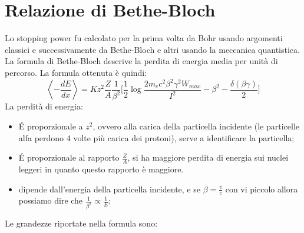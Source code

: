 \documentclass[12pt, letterpaper]{book}
\newcommand{\medio}[1]{\left\langle{#1}\right\rangle}
\begin{document}
\section{Relazione di Bethe-Bloch}
Lo stopping power fu calcolato per la prima volta da Bohr usando argomenti classici e successivamente da Bethe-Bloch e altri usando la meccanica quantistica.\\
La formula di Bethe-Bloch descrive la perdita di energia media per unità di percorso. La formula ottenuta è quindi:
\begin{equation*}
    \medio{-\frac{dE}{dx}}=Kz^2\frac{Z}{A}\frac{1}{\beta^2}\Bigg[ \frac{1}{2} \log{\frac{2m_ec^2\beta^2\gamma^2W_{max}}{I^2}}-\beta^2-\frac{\delta(\beta\gamma)}{2} \Bigg]
\end{equation*}
La perdità di energia:
\begin{itemize}
    \item \'E proporzionale a $z^2$, ovvero alla carica della particella incidente (le particelle alfa perdono 4 volte più carica dei protoni), serve a identificare la particella;
    \item \'E proporzionale al rapporto $\frac{Z}{A}$, si ha maggiore perdita di energia sui nuclei leggeri in quanto questo rapporto è maggiore.
    \item dipende dall'energia della particella incidente, e se $\beta=\frac{v}{c}$ con vi piccolo allora possiamo dire che $\frac{1}{\beta^2}\propto\frac{1}{E}$;
\end{itemize}
Le grandezze riportate nella formula sono:
\end{document}
